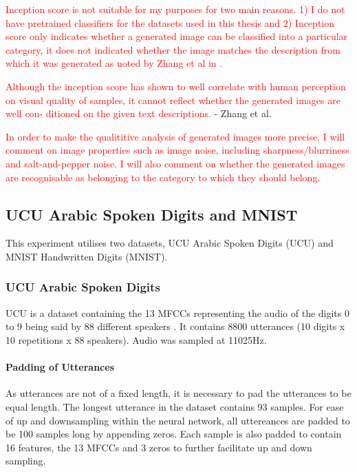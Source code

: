 \textcolor{red}{Inception score is not suitable for my purposes for two main reasons. 1) I do not have pretrained classifiers for the datasets used in this thesis and 2) Inception score only indicates whether a generated image can be classified into a particular category, it does not indicated whether the image matches the description from which it was generated as noted by Zhang et al in \cite{zhang2017stackgan}.}

\begin{displayquote}
\textcolor{red}{Although the inception score has shown to well correlate
with human perception on visual quality of samples, it
cannot reflect whether the generated images are well con-
ditioned on the given text descriptions.}
- Zhang et al.
\end{displayquote}

\textcolor{red}{In order to make the qualititive analysis of generated images more precise, I will comment on image properties such as image noise, including sharpness/blurriness and salt-and-pepper noise. I will also comment on whether the generated images are recognisable as belonging to the category to which they should belong.} 

\subsection{UCU Arabic Spoken Digits and MNIST} 
\label{sec:UCU}
This experiment utilises two datasets, UCU Arabic Spoken Digits (UCU) and MNIST Handwritten Digits (MNIST).

\subsubsection{UCU Arabic Spoken Digits}
UCU is a dataset containing the 13 \acp{MFCC} representing the audio of the digits 0 to 9 being said by 88 different speakers \cite{hammami2009tree,hammami2010improved}. It contains 8800 utterances (10 digits x 10 repetitions x 88 speakers). Audio was sampled at 11025Hz.

\paragraph{Padding of Utterances}
As utterances are not of a fixed length, it is necessary to pad the utterances to be equal length. The longest utterance in the dataset contains 93 samples. For ease of up and downsampling within the neural network, all uttereances are padded to be 100 samples long by appending zeros. Each sample is also padded to contain 16 features, the 13 \acp{MFCC} and 3 zeros to further facilitate up and down sampling.


